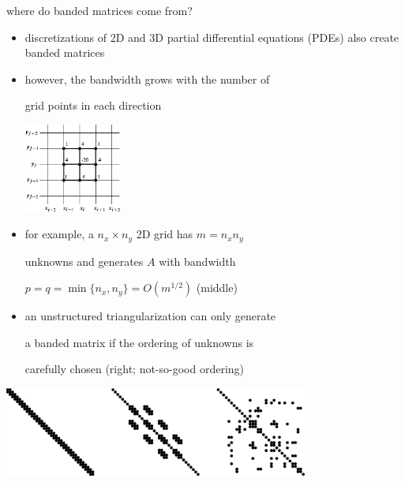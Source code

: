 \documentclass[10pt,
               svgnames,
               hyperref={colorlinks,citecolor=DeepPink4,linkcolor=FireBrick,urlcolor=Maroon},
               usepdftitle=false]{beamer}
\begin{document}
\begin{frame}{where do banded matrices come from?}

\begin{itemize}
\item discretizations of 2D and 3D partial differential equations (PDEs) also create banded matrices
\item however, the \alert{bandwidth} \alert{grows} with the number of

grid points in each direction

\vspace{-10mm}
\hfill \includegraphics[width=0.25\textwidth]{images/stencil9.png}

\vspace{-18mm}
\item for example, a $n_x \times n_y$ 2D grid has $m=n_x n_y$

unknowns and generates $A$ with bandwidth

$p=q=\min\{n_x,n_y\} = O(m^{1/2})$ (middle)

\item an unstructured triangularization can only generate

a banded matrix if the ordering of unknowns is

carefully chosen (right; not-so-good ordering)
\end{itemize}

\begin{center}
\includegraphics[width=0.75\textwidth]{images/spythree.png}
\end{center}
\end{frame}
\end{document}
